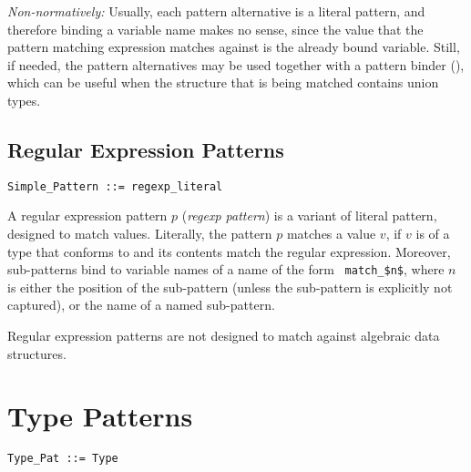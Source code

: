 {\em Non-normatively:} Usually, each pattern alternative is a literal pattern, and therefore binding a variable name makes no sense, since the value that the pattern matching expression matches against is the already bound variable. Still, if needed, the pattern alternatives may be used together with a pattern binder (), which can be useful when the structure that is being matched contains union types. 





\subsection{Regular Expression Patterns}
\label{sec:regexp-patterns}

\syntax\begin{lstlisting}
Simple_Pattern ::= regexp_literal
\end{lstlisting}

A regular expression pattern $p$ ({\em regexp pattern}) is a variant of literal pattern, designed to match  values. Literally, the pattern $p $ matches a value $v$, if $v$ is of a type that conforms to  and its contents match the regular expression. Moreover, sub-patterns bind to variable names of a name of the form ~\lstinline!match_$n$!, where $n$ is either the position of the sub-pattern (unless the sub-pattern is explicitly not captured), or the name of a named sub-pattern. 

Regular expression patterns are not designed to match against algebraic data structures. 






\section{Type Patterns}
\label{sec:type-patterns}

\syntax\begin{lstlisting}
Type_Pat ::= Type
\end{lstlisting}

